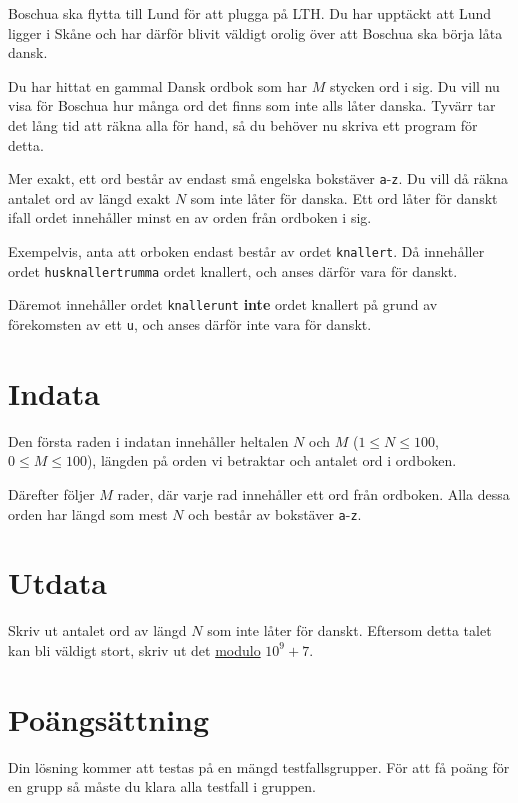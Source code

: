 
\noindent

Boschua ska flytta till Lund för att plugga på LTH. Du har upptäckt att Lund ligger i Skåne
och har därför blivit väldigt orolig över att Boschua ska börja låta dansk.

Du har hittat en gammal Dansk ordbok som har $M$ stycken ord i sig. Du vill nu visa för Boschua hur många
ord det finns som inte alls låter danska. Tyvärr tar det lång tid att räkna alla för hand, så du
behöver nu skriva ett program för detta.

Mer exakt, ett ord består av endast små engelska bokstäver \texttt{a}-\texttt{z}. Du vill då räkna antalet ord
av längd exakt $N$ som inte låter för danska. Ett ord låter för danskt ifall ordet innehåller minst en av orden
från ordboken i sig.

Exempelvis, anta att orboken endast består av ordet \texttt{knallert}. Då innehåller ordet \texttt{husknallertrumma}
ordet knallert, och anses därför vara för danskt.

Däremot innehåller ordet \texttt{knallerunt} \textbf{inte} ordet knallert på grund av förekomsten av ett \texttt{u},
och anses därför inte vara för danskt.



\section*{Indata}
Den första raden i indatan innehåller heltalen $N$ och $M$ ($1 \le N \le 100$, $0 \le M \le 100$),
längden på orden vi betraktar och antalet ord i ordboken.

Därefter följer $M$ rader, där varje rad innehåller ett ord från ordboken. Alla dessa orden har längd som mest $N$
och består av bokstäver \texttt{a}-\texttt{z}. 


\section*{Utdata}
Skriv ut antalet ord av längd $N$ som inte låter för danskt. Eftersom detta talet kan bli väldigt stort,
skriv ut det \href{https://en.wikipedia.org/wiki/Modulo}{modulo} $10^9+7$. 

\section*{Poängsättning}
Din lösning kommer att testas på en mängd testfallsgrupper.
För att få poäng för en grupp så måste du klara alla testfall i gruppen.

